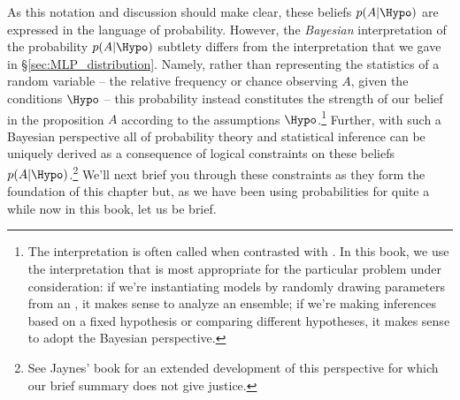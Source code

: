 As this notation and discussion 
should make clear, these beliefs $p(A\vert\Hypo)$ are expressed in the language of probability. However, the \emph{Bayesian} interpretation of the probability $p(A\vert\Hypo)$ subtlety differs from the  interpretation that we gave in \S\ref{sec:MLP_distribution}. Namely, rather than representing the statistics of a random variable -- the relative frequency or chance observing $A$, given the conditions $\Hypo$ -- this probability instead 
constitutes
the strength of our belief in the proposition $A$ according to the assumptions $\Hypo$.\footnote{
The 
 interpretation is often called  
when contrasted with .
In this book, we use the interpretation
that is most appropriate for the particular problem under consideration: if we're instantiating models by randomly drawing parameters from an , it makes sense to analyze an ensemble; if we're
making inferences based on a fixed hypothesis or comparing different hypotheses, it makes sense to adopt the Bayesian perspective.
}
Further, with such a Bayesian perspective all of probability theory and statistical inference can be uniquely derived as a consequence of logical constraints on these beliefs $p(A\vert\Hypo)$.\footnote{
    See Jaynes' book \cite{jaynes2003probability} for 
    an
    extended development of this perspective
    for which our brief summary does not give 
    justice.
}
We'll next brief you through these constraints as
they form the foundation of this chapter
but, as we have been using probabilities for quite a while now in this book, let us be brief.


